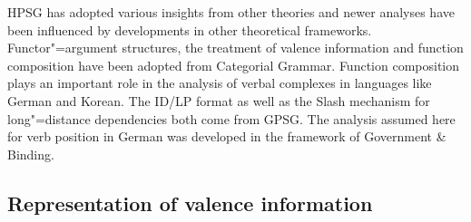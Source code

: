 HPSG has adopted various insights from other theories and newer analyses have been influenced by developments in other theoretical frameworks.
Functor"=argument structures, the treatment of valence information and function
composition have been adopted from
Categorial Grammar\indexcg. Function composition plays an important role in the analysis of verbal
complexes in languages like German and Korean. The ID/LP format as well as the
Slash mechanism for long"=distance dependencies both come from GPSG\indexgpsg. The analysis assumed here for verb position in German was
developed in the framework of Government \&
Binding\indexgb.

\subsection{Representation of valence information}

